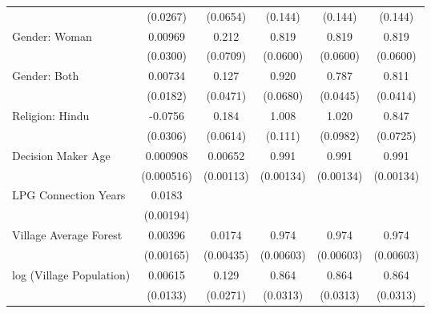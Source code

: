 {\begin{tabular}{l*{5}{c}}
                     &    (0.0267)         &    (0.0654)       &     (0.144)         &     (0.144)         &     (0.144)         \\
[1em]
Gender: Woman   &     0.00969         &       0.212\sym{**}  &       0.819\sym{**} &       0.819\sym{**} &       0.819\sym{**} \\
                   &    (0.0300)         &    (0.0709)         &    (0.0600)         &    (0.0600)         &    (0.0600)         \\
[1em]
Gender: Both          &     0.00734         &       0.127\sym{**}  &       0.920         &       0.787\sym{***}&       0.811\sym{***}\\
                   &    (0.0182)         &    (0.0471)         &    (0.0680)         &    (0.0445)         &    (0.0414)         \\
[1em]
Religion: Hindu         &     -0.0756\sym{*}  &       0.184\sym{**}         &       1.008         &       1.020         &       0.847         \\
                    &    (0.0306)         &    (0.0614)        &     (0.111)         &    (0.0982)         &    (0.0725)         \\
[1em]
Decision Maker Age             &    0.000908         &     0.00652\sym{***}&       0.991\sym{***}&       0.991\sym{***}&       0.991\sym{***}\\
                    &  (0.000516)         &   (0.00113)         &   (0.00134)         &   (0.00134)         &   (0.00134)         \\
[1em]
LPG Connection Years &      0.0183\sym{***}&                     &                     &                     &                     \\
                    &   (0.00194)         &                     &                     &                     &                     \\
[1em]
Village Average Forest           &     0.00396\sym{*}  &      0.0174\sym{***}&       0.974\sym{***}&       0.974\sym{***}&       0.974\sym{***}\\
                    &   (0.00165)         &   (0.00435)         &   (0.00603)         &   (0.00603)         &   (0.00603)         \\
[1em]
log (Village Population)      &     0.00615         &       0.129\sym{***}&       0.864\sym{***}&       0.864\sym{***}&       0.864\sym{***}\\
                    &    (0.0133)         &    (0.0271)         &    (0.0313)         &    (0.0313)         &    (0.0313)         \\

\end{tabular}}
